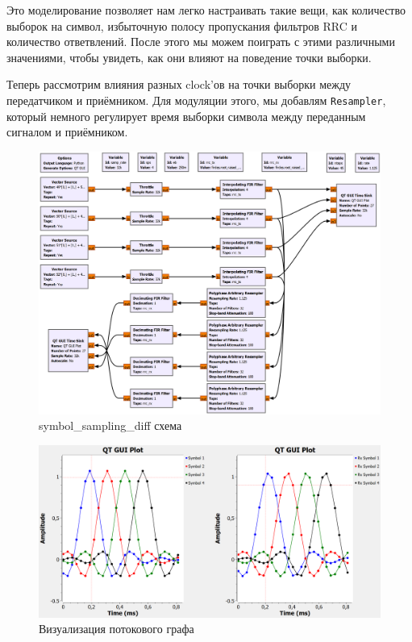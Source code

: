 \documentclass[a4paper,12pt]{report}
\begin{document}
Это моделирование позволяет нам легко настраивать такие вещи, как количество выборок на символ, избыточную полосу пропускания фильтров RRC и количество ответвлений. После этого мы можем поиграть с этими различными значениями, чтобы увидеть, как они влияют на поведение точки выборки.

Теперь рассмотрим влияния разных clock'ов на точки выборки между передатчиком и приёмником. Для модуляции этого, мы добавлям \texttt{Resampler}, который немного регулирует время выборки символа между переданным сигналом и приёмником.

\begin{figure}[H]
        \centering
        \includegraphics[width=1.0\textwidth]{9.png}
        \caption{symbol\_sampling\_diff схема}
        \label{fig:lab12_fig3_3}
\end{figure}

\begin{figure}[H]
        \centering
        \includegraphics[width=1.0\textwidth]{10.png}
        \caption{Визуализация потокового графа}
        \label{fig:lab12_fig3_4}
\end{figure}
\end{document}
